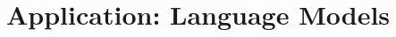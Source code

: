 \documentclass[10pt]{beamer}
\begin{document}





\section{Application: Language Models}
\end{document}

